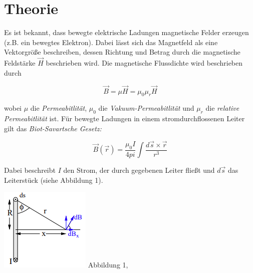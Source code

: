 \section{Theorie}
\label{sec:Theorie}

Es ist bekannt, dass bewegte elektrische Ladungen magnetische Felder erzeugen (z.B. ein bewegtes Elektron).
Dabei lässt sich das Magnetfeld als eine Vektorgröße beschreiben, dessen Richtung und Betrag durch die magnetische Feldstärke $\vec{H}$ beschrieben wird.
Die magnetische Flussdichte wird beschrieben durch

\begin{equation} \label{eq:Flussdichte}
    \vec{B} = \mu \vec{H} = \mu_{0} \mu_{r} \vec{H}
\end{equation}

wobei $\mu$ die \textit{Permeabitlität}, $\mu_{0}$ die \textit{Vakuum-Permeabitlität} und $\mu_{r}$ die \textit{relative Permeabitlität} ist.
Für bewegte Ladungen in einem stromdurchflossenen Leiter gilt das \textit{Biot-Savartsche Gesetz:}

\begin{equation} \label{eq:Biot-Savart-Gesetz}
    \vec{B}(\vec{r}) = \frac{\mu_{0}I}{4pi} \int \frac{d\vec{s} \times \vec{r}}{r^3}
\end{equation}


\begin{minipage}{0.7\textwidth}
    Dabei beschreibt $I$ den Strom, der durch gegebenen Leiter fließt und $d\vec{s}$ das Leiterstück (siehe Abbildung 1).
\end{minipage}
\begin{minipage}{0.3\textwidth}
    \includegraphics[width=\textwidth]{pictures/BiotSavart1.png}
    \small{Abbildung 1, \cite{sample}}
\end{minipage}

